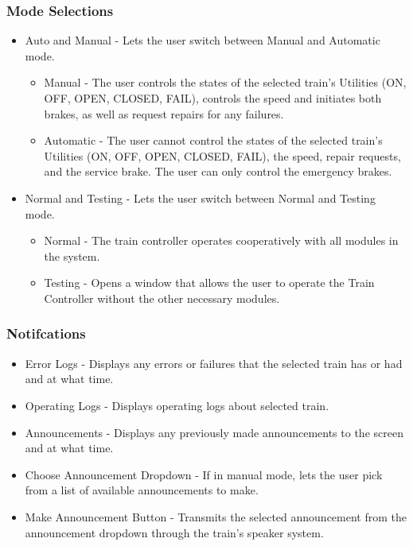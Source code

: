 \documentclass[letterpaper]{article}
\begin{document}
	\subsubsection{Mode Selections}
		\begin{itemize}
			\item Auto and Manual - Lets the user switch between Manual and Automatic mode. 
				\begin {itemize}
					\item Manual - The user controls the states of the selected train's Utilities (ON, OFF, OPEN, CLOSED, FAIL), controls the speed and initiates both brakes, as well as request repairs for any failures. 
					\item Automatic - The user cannot control the states of the selected train's Utilities (ON, OFF, OPEN, CLOSED, FAIL), the speed, repair requests, and the service brake. The user can only control the emergency brakes.
				\end{itemize}
			\item Normal and Testing - Lets the user switch between Normal and Testing mode. 
				\begin {itemize}
					\item Normal - The train controller operates cooperatively with all modules in the system. 
					\item Testing - Opens a window that allows the user to operate the Train Controller without the other necessary modules. 
				\end{itemize}
		\end{itemize}
	\subsubsection{Notifcations}
		\begin{itemize}
			\item Error Logs - Displays any errors or failures that the selected train has or had and at what time.
			\item Operating Logs - Displays operating logs about selected train.
			\item Announcements - Displays any previously made announcements to the screen and at what time. 
			\item Choose Announcement Dropdown - If in manual mode, lets the user pick from a list of available announcements to make. 
			\item Make Announcement Button - Transmits the selected announcement from the announcement dropdown through the train's speaker system. 
		\end{itemize}
\end{document}
